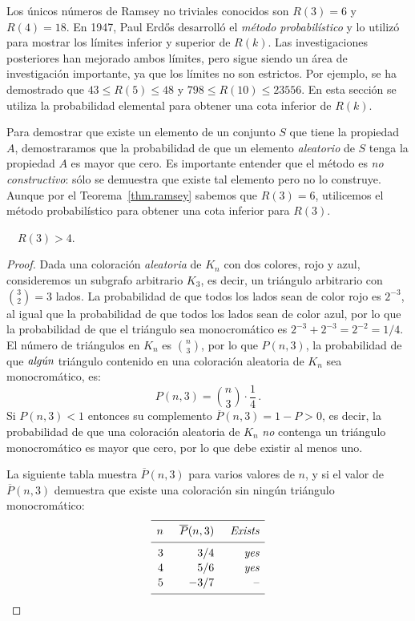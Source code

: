 Los únicos números de Ramsey no triviales conocidos son $R(3)=6$ y $R(4)=18$. En 1947, Paul Erd\H{o}s desarrolló el \emph{método probabilístico} y lo utilizó para mostrar los límites inferior y superior de $R(k)$. Las investigaciones posteriores han mejorado ambos límites, pero sigue siendo un área de investigación importante, ya que los límites no son estrictos. Por ejemplo, se ha demostrado que $43\leq R(5) \leq 48$ y $798\leq R(10)\leq 23556$. En esta sección se utiliza la probabilidad elemental para obtener una cota inferior de $R(k)$.

Para demostrar que existe un elemento de un conjunto $S$ que tiene la propiedad $A$, demostraramos que la probabilidad de que un elemento \emph{aleatorio} de $S$ tenga la propiedad $A$ es mayor que cero. Es importante entender que el método es \emph{no constructivo}: sólo se demuestra que existe tal elemento pero no lo construye. Aunque por el Teorema~\ref{thm.ramsey} sabemos que $R(3)=6$, utilicemos el método probabilístico para obtener una cota inferior para $R(3)$.
\begin{theorem}[Erd\H{o}s]
$\quad R(3) > 4$.
\end{theorem}
\begin{proof}
Dada una coloración \emph{aleatoria} de $K_n$ con dos colores, rojo y azul, consideremos un subgrafo arbitrario $K_3$, es decir, un triángulo arbitrario con $\binom{3}{2}=3$ lados. La probabilidad de que todos los lados sean de color rojo es $2^{-3}$, al igual que la probabilidad de que todos los lados sean de color azul, por lo que la probabilidad de que el triángulo sea monocromático es $2^{-3}+2^{-3}=2^{-2}=1/4$. El número de triángulos en $K_n$ es $\binom{n}{3}$, por lo que $P(n,3)$, la probabilidad de que $\emph{algún}$ triángulo contenido en una coloración aleatoria de $K_n$ sea monocromático, es:
\[
P(n,3)=\binom{n}{3}\cdot \frac{1}{4}\,.
\]
Si $P(n,3)<1$ entonces su complemento $\overline{P}(n,3)=1-P>0$, es decir, la probabilidad de que una coloración aleatoria de $K_n$ \emph{no} contenga un triángulo monocromático es mayor que cero, por lo que debe existir al menos uno.

La siguiente tabla muestra $\overline{P}(n,3)$ para varios valores de $n$, y si el valor de $\overline{P}(n,3)$ demuestra que existe una coloración sin ningún triángulo monocromático:
\[
\renewcommand*{\arraystretch}{1.1}
\begin{array}{r@{\hspace{5mm}}r@{\hspace{5mm}}r}
\hline
\noalign{\smallskip}
n & \overline{P}(n,3) & \textit{Exists}\\
\noalign{\smallskip}\hline\noalign{\smallskip}
3 & 3/4 & \textit{yes} \\
4 & 5/6 & \textit{yes}\\
5 & -3/7 & \textrm{--}\\
\noalign{\smallskip}
 \hline
 \end{array}
\]
\end{proof}

